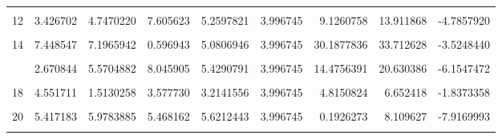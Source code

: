 \documentclass[]{tufte-handout}
\begin{document}
\begin{table}
{\begin{tabular}[t]{rrrrrrrrr}
\addlinespace
\cellcolor{gray!6}{11} & \cellcolor{gray!6}{3.162586} & \cellcolor{gray!6}{2.4739477} & \cellcolor{gray!6}{3.156060} & \cellcolor{gray!6}{2.9308644} & \cellcolor{gray!6}{3.996745} & \cellcolor{gray!6}{0.3131807} & \cellcolor{gray!6}{3.721481} & \cellcolor{gray!6}{-3.4083007}\\
12 & 3.426702 & 4.7470220 & 7.605623 & 5.2597821 & 3.996745 & 9.1260758 & 13.911868 & -4.7857920\\
\cellcolor{gray!6}{13} & \cellcolor{gray!6}{4.858415} & \cellcolor{gray!6}{6.6613752} & \cellcolor{gray!6}{3.807375} & \cellcolor{gray!6}{5.1090549} & \cellcolor{gray!6}{3.996745} & \cellcolor{gray!6}{4.1668899} & \cellcolor{gray!6}{7.878594} & \cellcolor{gray!6}{-3.7117037}\\
14 & 7.448547 & 7.1965942 & 0.596943 & 5.0806946 & 3.996745 & 30.1877836 & 33.712628 & -3.5248440\\
\cellcolor{gray!6}{15} & \cellcolor{gray!6}{5.204287} & \cellcolor{gray!6}{-4.9059256} & \cellcolor{gray!6}{1.280274} & \cellcolor{gray!6}{0.5262118} & \cellcolor{gray!6}{3.996745} & \cellcolor{gray!6}{51.9611147} & \cellcolor{gray!6}{88.094905} & \cellcolor{gray!6}{-36.1337908}\\
\addlinespace
16 & 2.670844 & 5.5704882 & 8.045905 & 5.4290791 & 3.996745 & 14.4756391 & 20.630386 & -6.1547472\\
\cellcolor{gray!6}{17} & \cellcolor{gray!6}{3.156763} & \cellcolor{gray!6}{-0.3528402} & \cellcolor{gray!6}{7.303819} & \cellcolor{gray!6}{3.3692471} & \cellcolor{gray!6}{3.996745} & \cellcolor{gray!6}{29.3799398} & \cellcolor{gray!6}{30.561199} & \cellcolor{gray!6}{-1.1812588}\\
18 & 4.551711 & 1.5130258 & 3.577730 & 3.2141556 & 3.996745 & 4.8150824 & 6.652418 & -1.8373358\\
\cellcolor{gray!6}{19} & \cellcolor{gray!6}{8.398765} & \cellcolor{gray!6}{7.4489186} & \cellcolor{gray!6}{3.508472} & \cellcolor{gray!6}{6.4520516} & \cellcolor{gray!6}{3.996745} & \cellcolor{gray!6}{13.4480976} & \cellcolor{gray!6}{31.533696} & \cellcolor{gray!6}{-18.0855988}\\
20 & 5.417183 & 5.9783885 & 5.468162 & 5.6212443 & 3.996745 & 0.1926273 & 8.109627 & -7.9169993\\
\addlinespace
\cellcolor{gray!6}{21} & \cellcolor{gray!6}{2.735636} & \cellcolor{gray!6}{7.3445911} & \cellcolor{gray!6}{5.119664} & \cellcolor{gray!6}{5.0666305} & \cellcolor{gray!6}{3.996745} & \cellcolor{gray!6}{10.6254527} & \cellcolor{gray!6}{14.059421} & \cellcolor{gray!6}{-3.4339684}\\

\end{tabular}}
\end{table}
\end{document}
